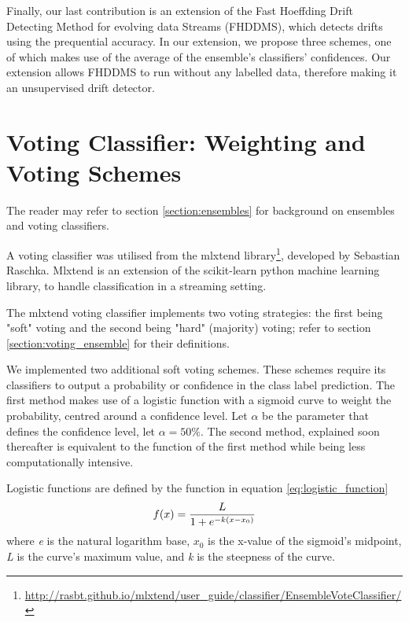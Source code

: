 Finally, our last contribution is an extension of the Fast Hoeffding Drift Detecting Method for evolving data Streams (FHDDMS), which detects drifts using the prequential accuracy. In our extension, we propose three schemes, one of which makes use of the average of the ensemble's classifiers' confidences. Our extension allows FHDDMS to run without any labelled data, therefore making it an unsupervised drift detector.


\section{Voting Classifier: Weighting and Voting Schemes \label{section:new_voting_strategy}}

The reader may refer to section \ref{section:ensembles} for background on ensembles and voting classifiers.

A voting classifier was utilised from the mlxtend library\footnote{\url{http://rasbt.github.io/mlxtend/user_guide/classifier/EnsembleVoteClassifier/}}, developed by Sebastian Raschka. Mlxtend is an extension of the scikit-learn python machine learning library, to handle classification in a streaming setting.

The mlxtend voting classifier implements two voting strategies: the first being "soft" voting and the second being "hard" (majority) voting; refer to section \ref{section:voting_ensemble} for their definitions.

We implemented two additional soft voting schemes. These schemes require its classifiers to output a probability or confidence in the class label prediction. The first method makes use of a logistic function with a sigmoid curve to weight the probability, centred around a  confidence level. Let $\alpha$ be the parameter that defines the confidence level, let $\alpha=50\%$. The second method, explained soon thereafter is equivalent to the function of the first method while being less computationally intensive.


Logistic functions are defined by the function in equation \ref{eq:logistic_function}
\begin{equation}
    f(x)=\frac{L}{1+e^{-k(x-x_0)}}\\ 
    \label{eq:logistic_function}
\end{equation}
where \textit{e} is the natural logarithm base, \textit{$x_0$} is the x-value of the sigmoid's midpoint, \textit{L} is the curve's maximum value, and \textit{k} is the steepness of the curve.

